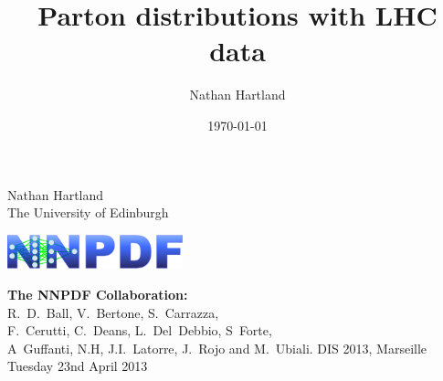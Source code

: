 \documentclass[10pt]{beamer}
\title[]{Parton distributions with LHC data}
\author{Nathan Hartland}
\institute
{
University of Edinburgh\\
\medskip
}
\date{\today}
\newcommand{\vso}{\vskip15pt}
\begin{document}
\renewcommand{\inserttotalframenumber}{18}


\begin{frame}
\begin{centering}
\vskip20pt
\vskip20pt
Nathan Hartland\\

\small{The University of Edinburgh}\\
\vso

\begin{center} \hskip10pt \includegraphics[height=1cm]{nnpdf_logo_official.eps} \end{center}


\vskip10pt
{\bf The NNPDF Collaboration:}\\
R.~D.~Ball, V.~Bertone, S.~Carrazza,\\ F.~Cerutti,
C.~Deans, L.~Del~Debbio, S~Forte,\\
A~Guffanti, N.H, J.I.~Latorre, J.~Rojo and M.~Ubiali.
\vskip20pt
DIS 2013, Marseille\\
Tuesday 23nd April 2013

\end{centering}

\end{frame}
\end{document}

